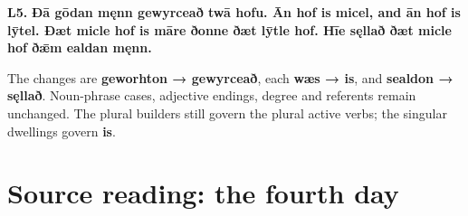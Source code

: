 \par\begin{minipage}{\linewidth}\raggedright
\textbf{L5.} \textbf{Ðā gōdan męnn gewyrceað twā hofu. Ān hof is micel, and ān hof is lȳtel. Ðæt micle hof is māre ðonne ðæt lȳtle hof. Hīe sęllað ðæt micle hof ðǣm ealdan męnn.}

The changes are \textbf{geworhton → gewyrceað}, each \textbf{wæs → is}, and \textbf{sealdon → sęllað}. Noun-phrase cases, adjective endings, degree and referents remain unchanged. The plural builders still govern the plural active verbs; the singular dwellings govern \textbf{is}.

\end{minipage}\par\addvspace{4pt}

\section*{Source reading: the fourth day}

